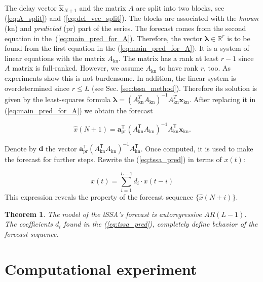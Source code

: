 \documentclass[referee, pdflatex, sn-mathphys-num]{sn-jnl}
\theoremstyle{definition}
\theoremstyle{plain}
\newtheorem{Th}{Theorem}
\newcommand{\delayV}[1]{\overset{\leftarrow}{\mathbf{x}}_{#1}}
\begin{document}
	The delay vector $ \delayV{N + 1} $ and the matrix $ A $ are split into two blocks, see (\ref{eq:A_split}) and (\ref{eq:del_vec_split}). The blocks are associated with the \emph{known} (kn) and \emph{predicted} (pr) part of the series. The forecast comes from the second equation in the~(\ref{eq:main_pred_for_A}). Therefore, the vector $ \boldsymbol{\lambda} \in \mathbb{R}^r $ is to be found from the first equation in the (\ref{eq:main_pred_for_A}). It is a system of linear equations with the matrix $ A_{\text{kn}} $. The matrix has a rank at least $ r - 1 $ since $ A $ matrix is full-ranked. However, we assume $ A_{\text{kn}} $ to have rank $ r $, too. As experiments show this is not burdensome. In addition, the linear system is overdetermined since $ r \le L $ (see Sec. \ref{sec:tssa_method}). Therefore its solution is given by the least-squares formula $ \boldsymbol{\lambda} = (A_{\text{kn}}^T A_{\text{kn}})^{-1} A_{\text{kn}}^T \mathbf{x}_{\text{kn}} $. After replacing it in (\ref{eq:main_pred_for_A}) we obtain the forecast
	
	\begin{equation}\label{eq:tssa_pred}
		\hat{x}(N + 1) = \mathbf{a}_{\text{pr}}^{\mathsf{T}} (A_{\text{kn}}^{\mathsf{T}} A_{\text{kn}})^{-1} A_{\text{kn}}^{\mathsf{T}} \mathbf{x}_{\text{kn}}.
	\end{equation}
	
	Denote by $ \mathbf{d} $ the vector $ \mathbf{a}_{\text{pr}}^{\mathsf{T}} (A_{\text{kn}}^{\mathsf{T}} A_{\text{kn}})^{-1} A_{\text{kn}}^{\mathsf{T}} $. Once computed, it is used to make the forecast for further steps. Rewrite the (\ref{eq:tssa_pred}) in terms of $ x(t) $:
	
	\begin{equation*}\label{eq:autoregr}
		x(t) = \sum\limits_{i = 1}^{L - 1} d_i \cdot x(t - i)
	\end{equation*}
	This expression reveals the property of the forecast sequence $ \{\hat{x}(N + i)\} $.
	
	\begin{Th}		
		The model of the tSSA's forecast is \emph{autoregressive} $ AR(L - 1) $. The coefficients $ d_i $ found in the (\ref{eq:tssa_pred}), completely define behavior of the forecast sequence.
	\end{Th}
	
	\section{Computational experiment}	
	
\end{document}
